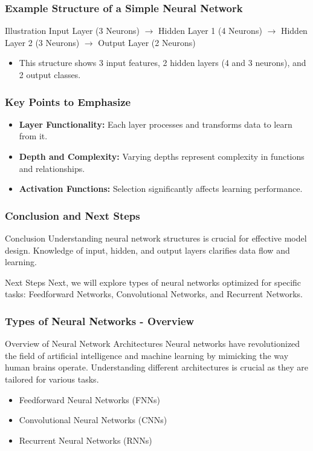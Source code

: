 \documentclass[aspectratio=169]{beamer}
\begin{document}
\begin{frame}[fragile]
    \frametitle{Example Structure of a Simple Neural Network}
    \begin{block}{Illustration}
        Input Layer (3 Neurons) $\to$ Hidden Layer 1 (4 Neurons) $\to$ Hidden Layer 2 (3 Neurons) $\to$ Output Layer (2 Neurons)
    \end{block}
    \begin{itemize}
        \item This structure shows 3 input features, 2 hidden layers (4 and 3 neurons), and 2 output classes.
    \end{itemize}
\end{frame}

\begin{frame}[fragile]
    \frametitle{Key Points to Emphasize}
    \begin{itemize}
        \item \textbf{Layer Functionality:} Each layer processes and transforms data to learn from it.
        \item \textbf{Depth and Complexity:} Varying depths represent complexity in functions and relationships.
        \item \textbf{Activation Functions:} Selection significantly affects learning performance.
    \end{itemize}
\end{frame}

\begin{frame}[fragile]
    \frametitle{Conclusion and Next Steps}
    \begin{block}{Conclusion}
        Understanding neural network structures is crucial for effective model design. Knowledge of input, hidden, and output layers clarifies data flow and learning.
    \end{block}
    \begin{block}{Next Steps}
        Next, we will explore types of neural networks optimized for specific tasks: Feedforward Networks, Convolutional Networks, and Recurrent Networks.
    \end{block}
\end{frame}

\begin{frame}[fragile]
    \frametitle{Types of Neural Networks - Overview}
    \begin{block}{Overview of Neural Network Architectures}
        Neural networks have revolutionized the field of artificial intelligence and machine learning by mimicking the way human brains operate. 
        Understanding different architectures is crucial as they are tailored for various tasks.
    \end{block}
    \begin{itemize}
        \item Feedforward Neural Networks (FNNs)
        \item Convolutional Neural Networks (CNNs)
        \item Recurrent Neural Networks (RNNs)
    \end{itemize}
\end{frame}
\end{document}
